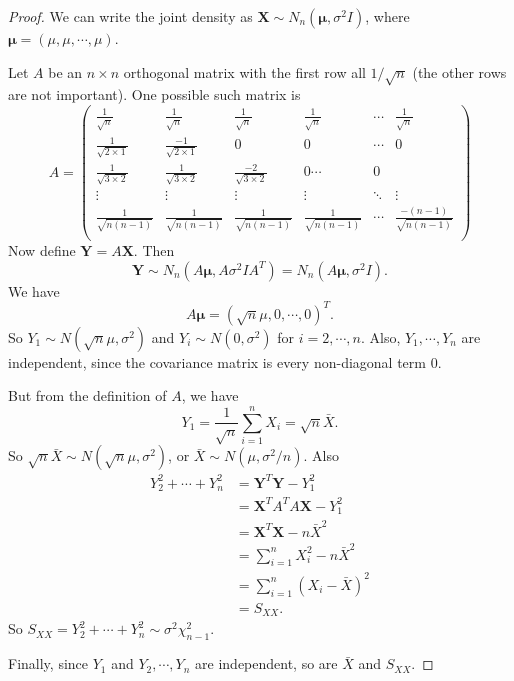 \documentclass[a4paper]{article}
\begin{document}
\begin{proof}
  We can write the joint density as $\mathbf{X} \sim N_n(\boldsymbol\mu, \sigma^2I)$, where $\boldsymbol\mu = (\mu, \mu, \cdots, \mu)$.

  Let $A$ be an $n\times n$ orthogonal matrix with the first row all $1/\sqrt{n}$ (the other rows are not important). One possible such matrix is
  \[
    A =
    \begin{pmatrix}
      \frac{1}{\sqrt{n}} & \frac{1}{\sqrt{n}} & \frac{1}{\sqrt{n}} & \frac{1}{\sqrt{n}} & \cdots & \frac{1}{\sqrt{n}}\\
      \frac{1}{\sqrt{2\times 1}} & \frac{-1}{\sqrt{2\times 1}} & 0 & 0 & \cdots & 0\\
      \frac{1}{\sqrt{3\times 2}} & \frac{1}{\sqrt{3\times 2}} & \frac{-2}{\sqrt{3\times 2}} & 0 \cdots & 0\\
      \vdots & \vdots & \vdots & \vdots & \ddots & \vdots \\
      \frac{1}{\sqrt{n(n - 1)}} & \frac{1}{\sqrt{n(n - 1)}} & \frac{1}{\sqrt{n(n - 1)}} & \frac{1}{\sqrt{n(n - 1)}} & \cdots & \frac{-(n - 1)}{\sqrt{n(n - 1)}} \\
    \end{pmatrix}
  \]
  Now define $\mathbf{Y} = A\mathbf{X}$. Then
  \[
    \mathbf{Y} \sim N_n(A\boldsymbol\mu, A\sigma^2IA^T) = N_n(A\boldsymbol\mu, \sigma^2 I).
  \]
  We have
  \[
    A\boldsymbol\mu = (\sqrt{n}\mu, 0, \cdots, 0)^T.
  \]
  So $Y_1 \sim N(\sqrt{n}\mu, \sigma^2)$ and $Y_i \sim N(0, \sigma^2)$ for $i = 2, \cdots, n$. Also, $Y_1, \cdots, Y_n$ are independent, since the covariance matrix is every non-diagonal term $0$.

  But from the definition of $A$, we have
  \[
    Y_1 = \frac{1}{\sqrt{n}}\sum_{i = 1}^n X_i = \sqrt{n} \bar X.
  \]
  So $\sqrt{n} \bar X \sim N(\sqrt{n}\mu, \sigma^2)$, or $\bar X \sim N(\mu, \sigma^2/n)$. Also
  \begin{align*}
    Y_2^2 + \cdots + Y_n^2 &= \mathbf{Y}^T\mathbf{Y} - Y_1^2\\
    &= \mathbf{X}^TA^TA\mathbf{X} - Y_1^2\\
    &= \mathbf{X}^T\mathbf{X} - n\bar X^2\\
    &= \sum_{i = 1}^n X_i^2 - n\bar X^2\\
    &= \sum_{i = 1}^n (X_i - \bar X)^2 \\
    &= S_{XX}.
  \end{align*}
  So $S_{XX} = Y_2^2 + \cdots + Y^2_n \sim \sigma^2 \chi_{n - 1}^2$.

  Finally, since $Y_1$ and $Y_2, \cdots, Y_n$ are independent, so are $\bar X$ and $S_{XX}$.
\end{proof}
\end{document}
